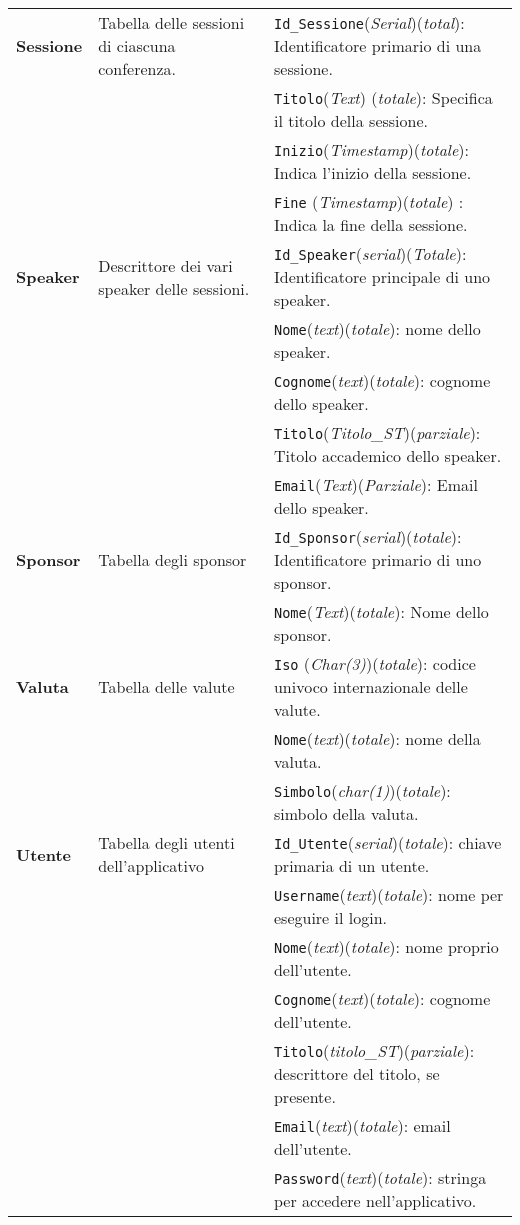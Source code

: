 \begin{longtable}{|p{}|p{}|p{}|}
	\textbf{Sessione} & Tabella delle sessioni di ciascuna conferenza. & \texttt{Id\_Sessione}(\textit{Serial})(\textit{total}): Identificatore primario di una sessione. \\
	& & \texttt{Titolo}(\textit{Text}) (\textit{totale}): Specifica il titolo della sessione. \\
	& & \texttt{Inizio}(\textit{Timestamp})(\textit{totale}): Indica l'inizio della sessione. \\
	& & \texttt{Fine} (\textit{Timestamp})(\textit{totale}) : Indica la fine della sessione. \\	\hline
	
	\textbf{Speaker} & Descrittore dei vari speaker delle sessioni. & \texttt{Id\_Speaker}(\textit{serial})(\textit{Totale}): Identificatore principale di uno speaker. \\
	& & \texttt{Nome}(\textit{text})(\textit{totale}): nome dello speaker. \\
	& & \texttt{Cognome}(\textit{text})(\textit{totale}): cognome dello speaker. \\
	& & \texttt{Titolo}(\textit{Titolo\_ST})(\textit{parziale}): Titolo accademico dello speaker. \\
	& & \texttt{Email}(\textit{Text})(\textit{Parziale}): Email dello speaker. \\	\hline
	
	\textbf{Sponsor} & Tabella degli sponsor & \texttt{Id\_Sponsor}(\textit{serial})(\textit{totale}): Identificatore primario di uno sponsor. \\
	& & \texttt{Nome}(\textit{Text})(\textit{totale}): Nome dello sponsor. \\ \hline
	
	\textbf{Valuta} & Tabella delle valute & \texttt{Iso} (\textit{Char(3)})(\textit{totale}): codice univoco internazionale delle valute. \\
	& & \texttt{Nome}(\textit{text})(\textit{totale}): nome della valuta. \\
	& & \texttt{Simbolo}(\textit{char(1)})(\textit{totale}): simbolo della valuta.\\ \hline
	\textbf{Utente} & Tabella degli utenti dell'applicativo & \texttt{Id\_Utente}(\textit{serial})(\textit{totale}): chiave primaria di un utente. \\
	& & \texttt{Username}(\textit{text})(\textit{totale}): nome per eseguire il login. \\
	& & \texttt{Nome}(\textit{text})(\textit{totale}): nome proprio dell'utente. \\
	& & \texttt{Cognome}(\textit{text})(\textit{totale}): cognome dell'utente. \\
	& & \texttt{Titolo}(\textit{titolo\_ST})(\textit{parziale}): descrittore del titolo, se presente. \\
	& & \texttt{Email}(\textit{text})(\textit{totale}): email dell'utente. \\ 
	& & \texttt{Password}(\textit{text})(\textit{totale}): stringa per accedere nell'applicativo. \\ 
\end{longtable}